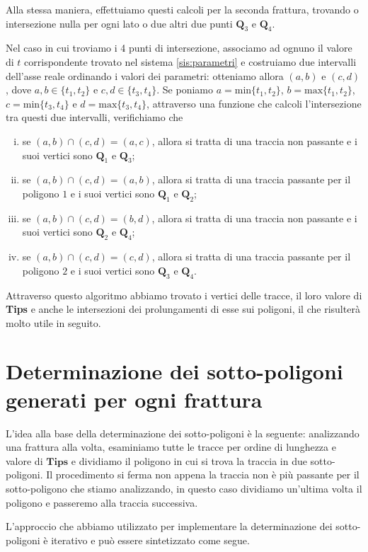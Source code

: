 \documentclass[a4paper]{article}
\newcommand{\B}{\mathbf}
\begin{document}
Alla stessa maniera, effettuiamo questi calcoli per la seconda frattura, trovando o intersezione nulla per ogni lato o due altri due punti $\B{Q}_3$ e $\B{Q}_4$.

Nel caso in cui troviamo i 4 punti di intersezione, associamo ad ognuno il valore di $t$ corrispondente trovato nel sistema \eqref{sis:parametri} e costruiamo due intervalli dell'asse reale ordinando i valori dei parametri: otteniamo allora $(a,b)$ e $(c,d)$, dove $a,b\in\{t_1,t_2\}$ e $c,d\in\{t_3,t_4\}$. Se poniamo $a=\text{min}\{t_1,t_2\}$, $b=\text{max}\{t_1,t_2\}$, $c=\text{min}\{t_3,t_4\}$ e $d=\text{max}\{t_3,t_4\}$, attraverso una funzione che calcoli l'intersezione tra questi due intervalli, verifichiamo che
\begin{enumerate} [(i)]
\item se $(a,b)\cap(c,d)=(a,c)$, allora si tratta di una traccia non passante e i suoi vertici sono $\B{Q}_1$ e $\B{Q}_3$;
\item se $(a,b)\cap(c,d)=(a,b)$, allora si tratta di una traccia passante per il poligono $1$ e i suoi vertici sono $\B{Q}_1$ e $\B{Q}_2$;
\item se $(a,b)\cap(c,d)=(b,d)$, allora si tratta di una traccia non passante e i suoi vertici sono $\B{Q}_2$ e $\B{Q}_4$;
\item se $(a,b)\cap(c,d)=(c,d)$, allora si tratta di una traccia passante per il poligono $2$ e i suoi vertici sono $\B{Q}_3$ e $\B{Q}_4$.
\end{enumerate}
Attraverso questo algoritmo abbiamo trovato i vertici delle tracce, il loro valore di \textbf{Tips} e anche le intersezioni dei prolungamenti di esse sui poligoni, il che risulterà molto utile in seguito.

\section{Determinazione dei sotto-poligoni generati per ogni frattura}

L'idea alla base della determinazione dei sotto-poligoni è la seguente: analizzando una frattura alla volta, esaminiamo tutte le tracce per ordine di lunghezza e valore di $\B{Tips}$ e dividiamo il poligono in cui si trova la traccia in due sotto-poligoni. Il procedimento si ferma non appena la traccia non è più passante per il sotto-poligono che stiamo analizzando, in questo caso dividiamo un'ultima volta il poligono e passeremo alla traccia successiva. 

L'approccio che abbiamo utilizzato per implementare la determinazione dei sotto-poligoni è iterativo e può essere sintetizzato come segue.  
\end{document}
